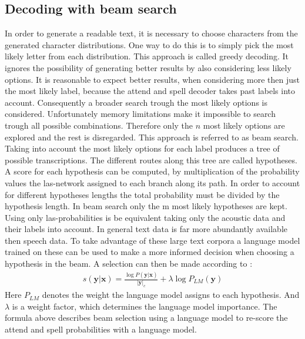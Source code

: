 \subsection{Decoding with beam search}
In order to generate a readable text, it is necessary to choose characters from the generated character distributions. One way to do this is to simply pick the most likely letter from each distribution. This approach is called greedy decoding. It ignores the possibility of generating better results by also considering less likely options. It is reasonable to expect better results, when considering more then just the most likely label, because the attend and spell decoder takes past labels into account. Consequently a broader search trough the most likely options is considered. Unfortunately memory limitations make it impossible to search trough all possible combinations. Therefore only the $n$ most likely options are explored and the rest is disregarded. This approach is referred to as beam search. Taking into account the most likely options for each label produces a tree of possible transcriptions. The different routes along this tree are called hypotheses. A score for each hypothesis can be computed, by multiplication of the probability values the las-network assigned to each branch along its path. In order to account for different hypotheses lengths the total probability must be divided by the hypothesis length. In beam search only the m most likely hypotheses are kept. Using only las-probabilities is be equivalent taking only the acoustic data and their labels into account. In general text data is far more abundantly available then speech data. To take advantage of these large text corpora a language model trained on these can be used to make a more informed decision when choosing a hypothesis in the beam. A selection can then be made according to \cite[page 6]{Chan2015}:
\begin{align}
s(\mathbf{y}|\mathbf{x}) = \frac{\log P(\mathbf{y}|\mathbf{x})}{ |\mathbf{y}|_c} + \lambda \log P_{LM}(\mathbf{y})
\end{align}
Here $P_{LM}$ denotes the weight the language model assigns to each hypothesis. And $\lambda$ is a weight factor, which determines the language model importance. The formula above describes beam selection using a language model to re-score the attend and spell probabilities with a language model.

